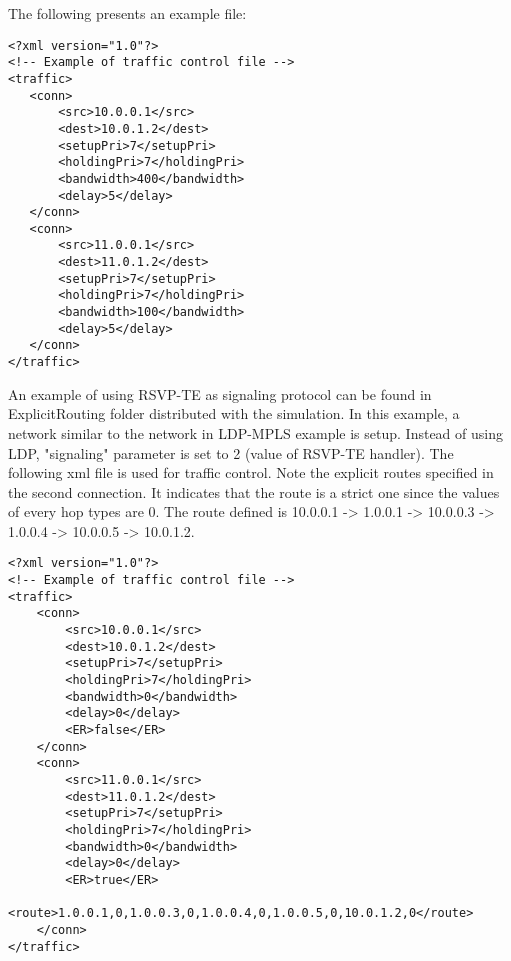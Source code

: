 The following presents an example file:

\begin{verbatim}
<?xml version="1.0"?>
<!-- Example of traffic control file -->
<traffic>
   <conn>
       <src>10.0.0.1</src>
       <dest>10.0.1.2</dest>
       <setupPri>7</setupPri>
       <holdingPri>7</holdingPri>
       <bandwidth>400</bandwidth>
       <delay>5</delay>
   </conn>
   <conn>
       <src>11.0.0.1</src>
       <dest>11.0.1.2</dest>
       <setupPri>7</setupPri>
       <holdingPri>7</holdingPri>
       <bandwidth>100</bandwidth>
       <delay>5</delay>
   </conn>
</traffic>
\end{verbatim}

An example of using RSVP-TE as signaling protocol can be found in
ExplicitRouting folder distributed with the simulation. In this
example, a network similar to the network in LDP-MPLS example is
setup. Instead of using LDP, "signaling" parameter is set to 2 (value
of RSVP-TE handler). The following xml file is used for traffic
control. Note the explicit routes specified in the second connection.
It indicates that the route is a strict one since the values of every
hop types are 0. The route defined is 10.0.0.1 -> 1.0.0.1 ->
10.0.0.3 -> 1.0.0.4 -> 10.0.0.5 -> 10.0.1.2.

\begin{verbatim}
<?xml version="1.0"?>
<!-- Example of traffic control file -->
<traffic>
    <conn>
        <src>10.0.0.1</src>
        <dest>10.0.1.2</dest>
        <setupPri>7</setupPri>
        <holdingPri>7</holdingPri>
        <bandwidth>0</bandwidth>
        <delay>0</delay>
        <ER>false</ER>
    </conn>
    <conn>
        <src>11.0.0.1</src>
        <dest>11.0.1.2</dest>
        <setupPri>7</setupPri>
        <holdingPri>7</holdingPri>
        <bandwidth>0</bandwidth>
        <delay>0</delay>
        <ER>true</ER>
        <route>1.0.0.1,0,1.0.0.3,0,1.0.0.4,0,1.0.0.5,0,10.0.1.2,0</route>
    </conn>
</traffic>
\end{verbatim}

\enddraft

